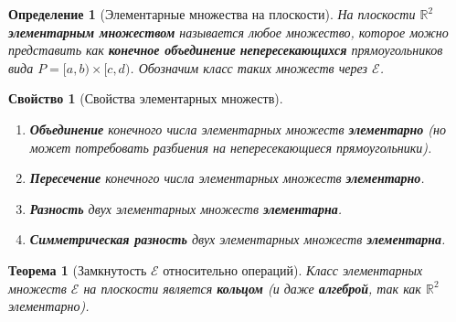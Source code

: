 \documentclass[a4paper, 12pt]{article}
\newtheorem{definition}{Определение}
\newtheorem{theorem}{Теорема}
\newtheorem{property}{Свойство}
\newcommand{\R}{\mathbb{R}}
\newcommand{\1}{\mathbf{1}}
\begin{document}
\begin{definition}[Элементарные множества на плоскости]
    На плоскости $\R^2$ \textbf{элементарным множеством} называется любое множество, которое можно представить как \textbf{конечное объединение} \textbf{непересекающихся} прямоугольников вида $P = [a,b) \times [c,d)$. Обозначим класс таких множеств через $\mathcal{E}$.
\end{definition}

\begin{property}[Свойства элементарных множеств]
    \hfill
    \begin{enumerate}[label=(\arabic*)]
        \item \textbf{Объединение} конечного числа элементарных множеств \textbf{элементарно} (но может потребовать разбиения на непересекающиеся прямоугольники).
        \item \textbf{Пересечение} конечного числа элементарных множеств \textbf{элементарно}.
        \item \textbf{Разность} двух элементарных множеств \textbf{элементарна}.
        \item \textbf{Симметрическая разность} двух элементарных множеств \textbf{элементарна}.
    \end{enumerate}
\end{property}

\begin{theorem}[Замкнутость $\mathcal{E}$ относительно операций]
    Класс элементарных множеств $\mathcal{E}$ на плоскости является \textbf{кольцом} (и даже \textbf{алгеброй}, так как $\R^2$ элементарно).
\end{theorem}
\end{document}
